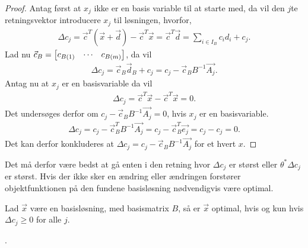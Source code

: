 \begin{proof}
Antag først at $x_j$ ikke er en basis variable til at starte med, da vil den $j$te retningsvektor introducere $x_j$ til løsningen, hvorfor,
\begin{align*}
\Delta c_j = \vec{c}^T(\vec{x}+ \vec{d}) - \vec{c}^T\vec{x} = \vec{c}^T\vec{d} = \sum_{i \in I_B} c_i d_i + c_j.
\end{align*}
Lad nu $\vec{c}_B = \begin{bmatrix} c_{B(1)}& \cdots & c_{B(m)} \end{bmatrix}$, da vil
\begin{align}
\Delta c_j =\vec{c}_B\vec{d}_B+ c_j = c_j-\vec{c}_B B^{-1}\vec{A_j}.
\end{align}
Antag nu at $x_j$ er en basisvariable da vil 
\begin{align*}
\Delta c_j = \vec{c}^T\vec{x}- \vec{c}^T\vec{x} = 0.
\end{align*}
Det undersøges derfor om $ c_j-\vec{c}_B B^{-1}\vec{A_j}= 0$, hvis $x_j$ er en basisvariable.
\begin{align*}
 \Delta c_j = c_j-\vec{c}_B^T B^{-1}\vec{A_j} = c_j - \vec{c}_B^T \vec{e_j} = c_j - c_j = 0.
\end{align*}
Det kan derfor konkluderes at $\Delta c_j = c_j-\vec{c}_B B^{-1}\vec{A_j}$ for et hvert $x$.
\end{proof}
Det må derfor være bedst at gå enten i den retning hvor $\Delta c_j$ er størst eller $\theta^*\Delta c_j$ er størst. 
Hvis der ikke sker en ændring eller ændringen forstører objektfunktionen på den fundene basisløsning nødvendigvis være optimal.
\begin{stn}
Lad $\vec{x}$ være en basisløsning, med basismatrix $B$, så er $\vec{x}$ optimal, hvis og kun hvis $\Delta c_j \geq 0$ for alle $j$.
\label{stn:optimalDeltaC}
\end{stn}.
